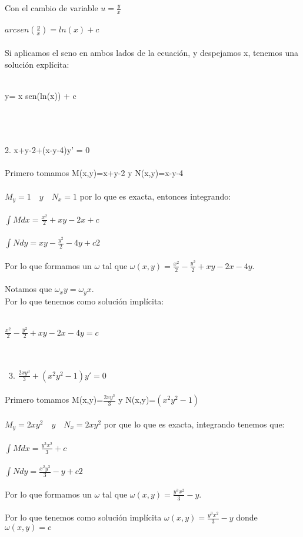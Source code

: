 \documentclass[a4paper,10pt]{article}
\begin{document}
Con el cambio de variable $u=\frac{y}{x}$\\\\
$arcsen(\frac{y}{x})= ln(x) + c $\\\\
Si aplicamos el seno en ambos lados de la ecuación, y despejamos x, tenemos una solución explícita:\\\\
\centerline{y= x sen(ln(x)) + c}\\\\\\
2. x+y-2+(x-y-4)y' = 0\\\\
Primero tomamos M(x,y)=x+y-2 y N(x,y)=x-y-4\\\\
$M_y = 1 \quad y \quad N_x=1 $ por lo que es exacta, entonces integrando:\\\\
$\int M dx = \frac{x^2}{2} + xy - 2x + c$\\\\
$\int N dy= xy - \frac{y^2}{2} -4y + c2$\\\\
Por lo que formamos un $\omega$  tal que $\omega(x,y)=\frac{x^2}{2}- \frac{y^2}{2} +xy -2x -4y$.\\\\
Notamos que $\omega_xy = \omega_yx$.\\
Por lo que tenemos como solución implícita:\\\\
\centerline{$\frac{x^2}{2}- \frac{y^2}{2} +xy -2x -4y = c $}\\\\\
3. $\frac{2xy^3}{3} + (x^2y^2-1)y'=0$\\\\ 
Primero tomamos M(x,y)=$\frac{2xy^3}{3}$ y N(x,y)=$(x^2y^2-1)$\\\\
 $M_y = 2xy^2 \quad y \quad N_x=2xy^2$ por que lo que es exacta, integrando tenemos que:\\\\
 $\int M dx = \frac{y^3x^2}{3} + c$\\\\
 $\int N dy =\frac{x^2y^3}{3}-y +c2$\\\\
 Por lo que formamos un $\omega$  tal que $\omega(x,y)=\frac{y^3x^2}{3} -y$.\\\\
 Por lo que tenemos como solución implícita $\omega(x,y)=\frac{y^3x^2}{3} -y$ donde $\omega(x,y) = c$\\
\end{document}
